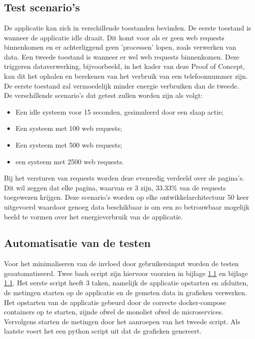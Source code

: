 

\chapter{}
\label{ch:test-poc}
\section{Test scenario's}
De applicatie kan zich in verschillende toestanden bevinden. De eerste toestand is wanneer de applicatie idle draait. Dit komt voor als er geen web requests binnenkomen en er achterliggend geen 'processen' lopen, zoals verwerken van data. Een tweede toestand is wanneer er wel web requests binnenkomen. Deze triggeren dataverwerking, bijvoorbeeld, in het kader van deze Proof of Concept, kan dit het ophalen en berekenen van het verbruik van een telefoonnummer zijn. De eerste toestand zal vermoedelijk minder energie verbruiken dan de tweede.\\

De verschillende scenario's dat getest zullen worden zijn als volgt:
\begin{itemize}
    \item Een idle systeem voor 15 seconden, gesimuleerd door een slaap actie;
    \item Een systeem met 100 web requests;
    \item Een systeem met 500 web requests;
    \item een systeem met 2500 web requests.
\end{itemize}

Bij het versturen van requests worden deze evenredig verdeeld over de pagina's. Dit wil zeggen dat elke pagina, waarvan er 3 zijn, 33.33\% van de requests toegewezen krijgen. Deze scenario's worden op elke ontwikkelarchitectuur 50 keer uitgevoerd waardoor genoeg data beschikbaar is om een zo betrouwbaar mogelijk beeld te vormen over het energieverbruik van de applicatie.

\section{Automatisatie van de testen}\label{tpoc_auto_test}
Voor het minimaliseren van de invloed door gebruikersinput worden de testen geautomatiseerd. Twee bash script zijn hiervoor voorzien in bijlage \ref{} en bijlage \ref{}. Het eerste script heeft 3 taken, namelijk de applicatie opstarten en afsluiten, de metingen starten op de applicatie en de gemeten data in grafieken verwerken. Het opstarten van de applicatie gebeurd door de correcte docker-compose containers op te starten, zijnde ofwel de monoliet ofwel de microservices. Vervolgens starten de metingen door het aanroepen van het tweede script. Als laatste voert het een python script uit dat de grafieken genereert.\\


